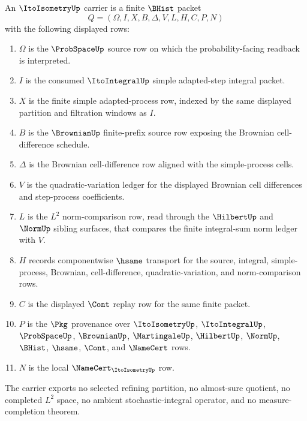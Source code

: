 \begin{definition}
\label{def:ito-isometry-carrier}
An $\ItoIsometryUp$ carrier is a finite $\BHist$ packet
$$
Q=(\Omega,I,X,B,\Delta,V,L,H,C,P,N)
$$
with the following displayed rows:
\begin{enumerate}
\item $\Omega$ is the $\ProbSpaceUp$ source row on which the probability-facing readback is interpreted.
\item $I$ is the consumed $\ItoIntegralUp$ simple adapted-step integral packet.
\item $X$ is the finite simple adapted-process row, indexed by the same displayed partition and filtration windows as $I$.
\item $B$ is the $\BrownianUp$ finite-prefix source row exposing the Brownian cell-difference schedule.
\item $\Delta$ is the Brownian cell-difference row aligned with the simple-process cells.
\item $V$ is the quadratic-variation ledger for the displayed Brownian cell differences and step-process coefficients.
\item $L$ is the $L^2$ norm-comparison row, read through the $\HilbertUp$ and $\NormUp$ sibling surfaces, that compares the finite integral-sum norm ledger with $V$.
\item $H$ records componentwise $\hsame$ transport for the source, integral, simple-process, Brownian, cell-difference, quadratic-variation, and norm-comparison rows.
\item $C$ is the displayed $\Cont$ replay row for the same finite packet.
\item $P$ is the $\Pkg$ provenance over $\ItoIsometryUp$, $\ItoIntegralUp$, $\ProbSpaceUp$, $\BrownianUp$, $\MartingaleUp$, $\HilbertUp$, $\NormUp$, $\BHist$, $\hsame$, $\Cont$, and $\NameCert$ rows.
\item $N$ is the local $\NameCert_{\ItoIsometryUp}$ row.
\end{enumerate}

The carrier exports no selected refining partition, no almost-sure quotient, no completed $L^2$ space, no ambient stochastic-integral operator, and no measure-completion theorem.
\end{definition}

